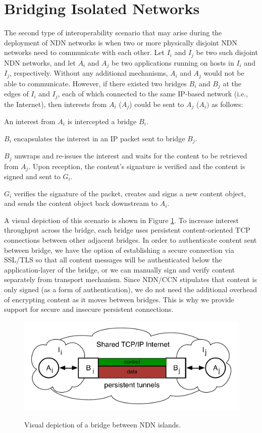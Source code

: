 \section{Bridging Isolated Networks} \label{sec:bridge}
The second type of interoperability scenario that may arise during the deployment of NDN networks is when two or more physically disjoint NDN networks need to communicate with each other. Let $I_i$ and $I_j$ be two such disjoint NDN networks, and let $A_i$ and $A_j$ be two applications running on hosts in $I_i$ and $I_j$, respectively. Without any additional mechanisms, $A_i$ and $A_j$ would not be able to communicate. However, if there existed two bridges $B_i$ and $B_j$ at the edges of $I_i$ and $I_j$, each of which connected to the same IP-based network (i.e., the Internet), then interests from $A_i$ ($A_j$) could be sent to $A_j$ ($A_i)$ as follows:
\begin{compactenum} 
	\item An interest from $A_i$ is intercepted a bridge $B_i$.
	\item $B_i$ encapsulates the interest in an IP packet sent to bridge $B_j$.
	\item $B_j$ unwraps and re-issues the interest and waits for the content to be retrieved from $A_j$. Upon reception, the content's signature is verified and the content is signed and sent to $G_i$. 
	\item $G_i$ verifies the signature of the packet, creates and signs a new content object, and sends the content object back downstream to $A_i$.
\end{compactenum}
A visual depiction of this scenario is shown in Figure \ref{fig:islands}. To increase interest throughput across the bridge, each bridge uses persistent content-oriented TCP connections between other adjacent bridges. In order to authenticate content sent between bridge, we have the option of establishing a secure connection via SSL/TLS so that all content messages will be authenticated below the application-layer of the bridge, or we can manually sign and verify content separately from transport mechanism. Since NDN/CCN stipulates that content is only signed (as a form of authentication), we do not need the additional overhead of encrypting content as it moves between bridges. This is why we provide support for secure and insecure persistent connections. 

\begin{figure}[ht!]
\begin{center}
\includegraphics[scale=0.45]{./images/island_tunnel.pdf}
\label{fig:islands}
\caption{Visual depiction of a bridge between NDN islands.}
\end{center}
\end{figure}

